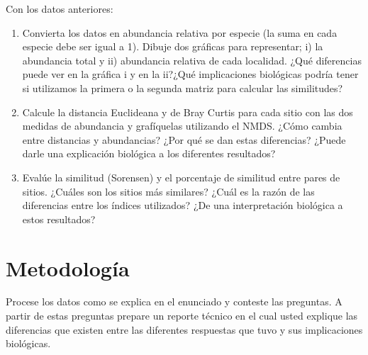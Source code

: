 \documentclass[]{book}
\begin{document}
Con los datos anteriores:

\begin{enumerate}
\def\labelenumi{\alph{enumi}.}
\item
  Convierta los datos en abundancia relativa por especie (la suma en
  cada especie debe ser igual a 1). Dibuje dos gráficas para
  representar; i) la abundancia total y ii) abundancia relativa de cada
  localidad. ¿Qué diferencias puede ver en la gráfica i y en la ii?¿Qué
  implicaciones biológicas podría tener si utilizamos la primera o la
  segunda matriz para calcular las similitudes?
\item
  Calcule la distancia Euclideana y de Bray Curtis para cada sitio con
  las dos medidas de abundancia y grafíquelas utilizando el NMDS. ¿Cómo
  cambia entre distancias y abundancias? ¿Por qué se dan estas
  diferencias? ¿Puede darle una explicación biológica a los diferentes
  resultados?
\item
  Evalúe la similitud (Sorensen) y el porcentaje de similitud entre
  pares de sitios. ¿Cuáles son los sitios más similares? ¿Cuál es la
  razón de las diferencias entre los índices utilizados? ¿De una
  interpretación biológica a estos resultados?
\end{enumerate}

\chapter{Metodología}\label{metodologia}

Procese los datos como se explica en el enunciado y conteste las
preguntas. A partir de estas preguntas prepare un reporte técnico en el
cual usted explique las diferencias que existen entre las diferentes
respuestas que tuvo y sus implicaciones biológicas.


\end{document}
